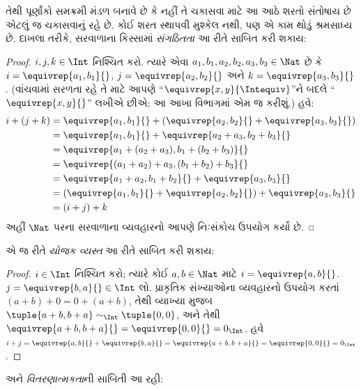 તેથી પૂર્ણાંકો સમક્રમી મંડળ બનાવે છે કે નહીં તે ચકાસવા માટે આ આઠે
શરતો સંતોષાય છે એટલું જ ચકાસવાનું રહે છે. કોઈ શરત સ્થાપવી {મુશ્કેલ}
નથી, પણ એ કામ થોડું શ્રમસાધ્ય છે. દાખલા તરીકે, સરવાળાના કિસ્સામાં
\emph{સંગઠિતતા} આ રીતે સાબિત કરી શકાય:

\begin{proof}
$i, j, k \in \Int$ નિશ્ચિત કરો. ત્યારે એવા $a_1, b_1, a_2, b_2, a_3, b_3 \in
\Nat$ છે કે $i = \equivrep{a_1, b_1}{}$, $j =
\equivrep{a_2,b_2}{}$ અને $k = \equivrep{a_3, b_3}{}$. (વાંચવામાં
સરળતા રહે તે માટે આપણે ``$\equivrep{x, y}{\Intequiv}$''ને બદલે
``$\equivrep{x, y}{}$'' લખીએ છીએ; આ આખા વિભાગમાં એમ જ કરીશું.) હવે:
\begin{align*}
	i + (j + k) &= \equivrep{a_1, b_1}{}+(\equivrep{a_2, b_2}{} + \equivrep{a_3, b_3}{}) \\
	&= \equivrep{a_1,  b_1}{} + \equivrep{a_2+a_3, b_2+b_3}{}\\
	&= \equivrep{a_1 + (a_2 + a_3), b_1 + (b_2 + b_3)}{}\\
	&= \equivrep{(a_1 + a_2) + a_3, (b_1 + b_2) + b_3}{}\\
	&= \equivrep{a_1 + a_2, b_1 + b_2}{} + \equivrep{a_3, b_3}{}\\
	&= (\equivrep{a_1, b_1}{} + \equivrep{a_2, b_2}{}) + \equivrep{a_3, b_3}{}\\
	&= (i+j) + k
\end{align*}
અહીં $\Nat$ પરના સરવાળાના વ્યવહારનો આપણે નિઃસંકોચ ઉપયોગ કર્યો છે.
\end{proof}

એ જ રીતે \emph{યોજક વ્યસ્ત} આ રીતે સાબિત કરી શકાય:

\begin{proof}
$i \in \Int$ નિશ્ચિત કરો; ત્યારે કોઈ $a,b \in \Nat$ માટે $i =
\equivrep{a,b}{}$. $j = \equivrep{b,a}{} \in \Int$ લો. પ્રાકૃતિક
સંખ્યાઓના વ્યવહારનો ઉપયોગ કરતાં $(a+b) + 0 = 0 + (a+b)$, તેથી
વ્યાખ્યા મુજબ $\tuple{a+b, b+a} \sim_\Int \tuple{0,0}$, અને તેથી
$\equivrep{a+b, b+a}{} = \equivrep{0, 0}{} = 0_\Int$. હવે $i + j =
\equivrep{a,b}{}+\equivrep{b,a}{}=\equivrep{a+b, b+a}{}= \equivrep{0,
0}{} = 0_\Int$.
\end{proof}

અને \emph{વિતરણાત્મકતા}ની સાબિતી આ રહી:

